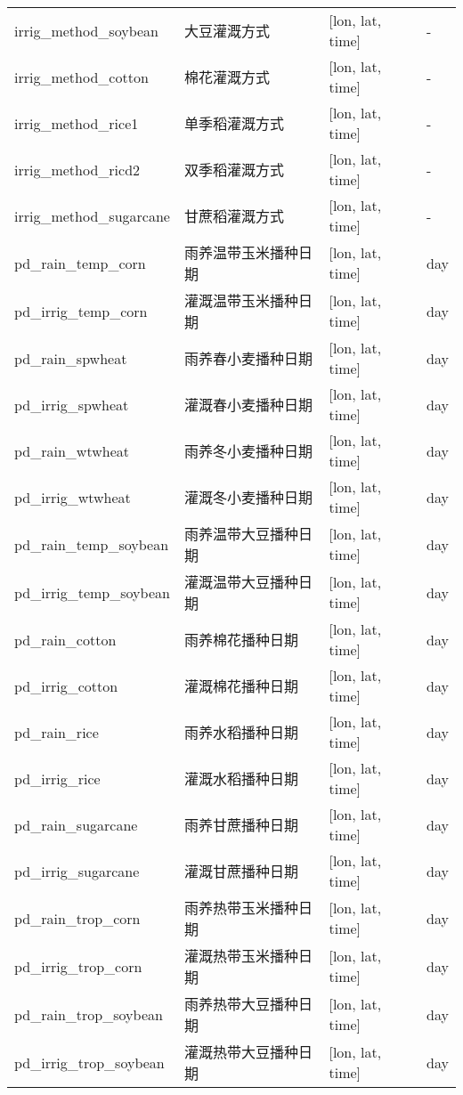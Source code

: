 {\begin{longtable}[htbp]{lp{}ll}
irrig\_method\_soybean & 大豆灌溉方式 & {[}lon, lat, time{]} & - \\
irrig\_method\_cotton & 棉花灌溉方式 & {[}lon, lat, time{]} & - \\
irrig\_method\_rice1 & 单季稻灌溉方式 & {[}lon, lat, time{]} & - \\
irrig\_method\_ricd2 & 双季稻灌溉方式 & {[}lon, lat, time{]} & - \\
irrig\_method\_sugarcane & 甘蔗稻灌溉方式 & {[}lon, lat, time{]} & - \\
pd\_rain\_temp\_corn & 雨养温带玉米播种日期 & {[}lon, lat, time{]} & \unit{day} \\
pd\_irrig\_temp\_corn & 灌溉温带玉米播种日期 & {[}lon, lat, time{]} & \unit{day} \\
pd\_rain\_spwheat & 雨养春小麦播种日期 & {[}lon, lat, time{]} & \unit{day} \\
pd\_irrig\_spwheat & 灌溉春小麦播种日期 & {[}lon, lat, time{]} & \unit{day} \\
pd\_rain\_wtwheat & 雨养冬小麦播种日期 & {[}lon, lat, time{]} & \unit{day} \\
pd\_irrig\_wtwheat & 灌溉冬小麦播种日期 & {[}lon, lat, time{]} & \unit{day} \\
pd\_rain\_temp\_soybean & 雨养温带大豆播种日期 & {[}lon, lat, time{]} & \unit{day} \\
pd\_irrig\_temp\_soybean & 灌溉温带大豆播种日期 & {[}lon, lat, time{]} & \unit{day} \\
pd\_rain\_cotton & 雨养棉花播种日期 & {[}lon, lat, time{]} & \unit{day} \\
pd\_irrig\_cotton & 灌溉棉花播种日期 & {[}lon, lat, time{]} & \unit{day} \\
pd\_rain\_rice & 雨养水稻播种日期 & {[}lon, lat, time{]} & \unit{day} \\
pd\_irrig\_rice & 灌溉水稻播种日期 & {[}lon, lat, time{]} & \unit{day} \\
pd\_rain\_sugarcane & 雨养甘蔗播种日期 & {[}lon, lat, time{]} & \unit{day} \\
pd\_irrig\_sugarcane & 灌溉甘蔗播种日期 & {[}lon, lat, time{]} & \unit{day} \\
pd\_rain\_trop\_corn & 雨养热带玉米播种日期 & {[}lon, lat, time{]} & \unit{day} \\
pd\_irrig\_trop\_corn & 灌溉热带玉米播种日期 & {[}lon, lat, time{]} & \unit{day} \\
pd\_rain\_trop\_soybean & 雨养热带大豆播种日期 & {[}lon, lat, time{]} & \unit{day} \\
pd\_irrig\_trop\_soybean & 灌溉热带大豆播种日期 & {[}lon, lat, time{]} & \unit{day} \\

\end{longtable}}
